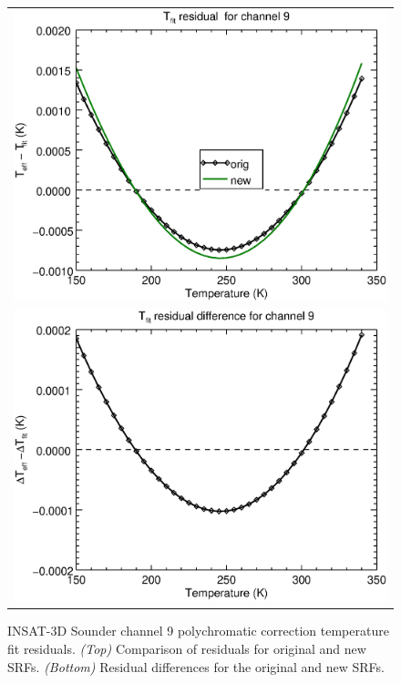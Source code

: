 \begin{figure}[H]
  \centering
  \begin{tabular}{c}
    \includegraphics[scale=0.55]{graphics/sndr/tfit/sndr_insat3d-9.tfit.eps} \\
    \includegraphics[scale=0.55]{graphics/sndr/tfit/sndr_insat3d-9.tfit.difference.eps}
  \end{tabular}
  \caption{INSAT-3D Sounder channel 9 polychromatic correction temperature fit residuals. \emph{(Top)} Comparison of residuals for original and new SRFs. \emph{(Bottom)} Residual differences for the original and new SRFs.}
  \label{fig:sndr_ch9_tfit}
\end{figure}


